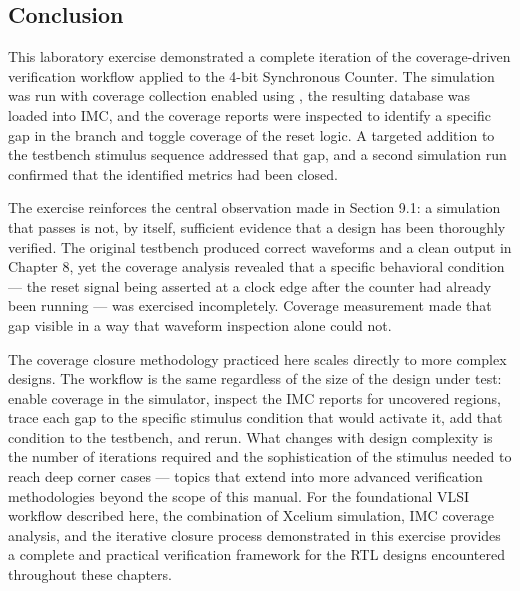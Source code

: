 \subsection{Conclusion}

This laboratory exercise demonstrated a complete iteration of the coverage-driven verification workflow applied to the 4-bit Synchronous Counter. The simulation was run with coverage collection enabled using , the resulting database was loaded into IMC, and the coverage reports were inspected to identify a specific gap in the branch and toggle coverage of the reset logic. A targeted addition to the testbench stimulus sequence addressed that gap, and a second simulation run confirmed that the identified metrics had been closed.\

The exercise reinforces the central observation made in Section 9.1: a simulation that passes is not, by itself, sufficient evidence that a design has been thoroughly verified. The original testbench produced correct waveforms and a clean  output in Chapter 8, yet the coverage analysis revealed that a specific behavioral condition — the reset signal being asserted at a clock edge after the counter had already been running — was exercised incompletely. Coverage measurement made that gap visible in a way that waveform inspection alone could not.\

The coverage closure methodology practiced here scales directly to more complex designs. The workflow is the same regardless of the size of the design under test: enable coverage in the simulator, inspect the IMC reports for uncovered regions, trace each gap to the specific stimulus condition that would activate it, add that condition to the testbench, and rerun. What changes with design complexity is the number of iterations required and the sophistication of the stimulus needed to reach deep corner cases — topics that extend into more advanced verification methodologies beyond the scope of this manual. For the foundational VLSI workflow described here, the combination of Xcelium simulation, IMC coverage analysis, and the iterative closure process demonstrated in this exercise provides a complete and practical verification framework for the RTL designs encountered throughout these chapters.\
